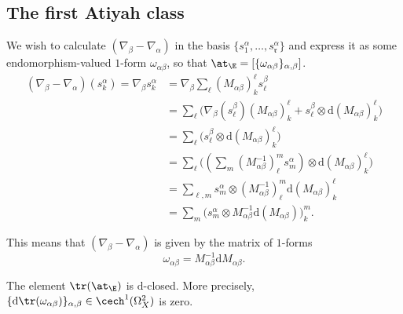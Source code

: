     \subsection{The first Atiyah class} %
    \label{sub:the_first_atiyah_class}

        We wish to calculate $(\nabla_\beta-\nabla_\alpha)$ in the basis $\{s^\alpha_1,\ldots,s^\alpha_\mathfrak{r}\}$ and express it as some endomorphism-valued $1$-form $\omega_{\alpha\beta}$, so that $\at_\E=[\{\omega_{\alpha\beta}\}_{\alpha,\beta}]$.
        \begin{align*}
            (\nabla_\beta-\nabla_\alpha)(s^\alpha_k) = \nabla_\beta s^\alpha_k
            &= \nabla_\beta\sum\nolimits_\ell(M_{\alpha\beta})_k^\ell s^\beta_\ell\\
            &= \sum\nolimits_\ell \big( \nabla_\beta (s^\beta_\ell) (M_{\alpha\beta})_k^\ell + s^\beta_\ell\otimes\mathrm{d}(M_{\alpha\beta})_k^\ell \big)\\
            &= \sum\nolimits_\ell \big( s^\beta_\ell\otimes \mathrm{d}(M_{\alpha\beta})_k^\ell \big)\\
            &= \sum\nolimits_\ell \Big( \left(\sum\nolimits_m (M_{\alpha\beta}^{-1})_\ell^m s^\alpha_m\right)\otimes \mathrm{d}(M_{\alpha\beta})_k^\ell \Big)\\
            &= \sum\nolimits_{\ell,m} s^\alpha_m\otimes (M_{\alpha\beta}^{-1})_\ell^m\mathrm{d}(M_{\alpha\beta})_k^\ell\\
            &= \sum\nolimits_m \big( s^\alpha_m\otimes M_{\alpha\beta}^{-1}\mathrm{d}(M_{\alpha\beta}) \big)_k^m.
        \end{align*}
        
        This means that $(\nabla_\beta-\nabla_\alpha)$ is given by the matrix of $1$-forms
        \begin{equation}\label{equation:nabla-minus-nabla-omega}
            \omega_{\alpha\beta} = M_{\alpha\beta}^{-1}\mathrm{d}M_{\alpha\beta}.
        \end{equation}
    
        \begin{lemma}
            The element $\tr(\at_\E)$ is $\mathrm{d}$-closed.
            More precisely, $\{\mathrm{d}\tr(\omega_{\alpha\beta})\}_{\alpha,\beta}\in\cech^1(\Omega^2_X)$ is zero.
        \end{lemma}
        
